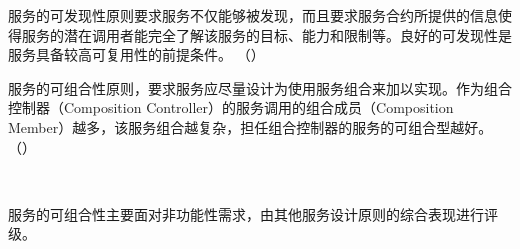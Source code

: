 \begin{problem}
	服务的可发现性原则要求服务不仅能够被发现，而且要求服务合约所提供的信息使得服务的潜在调用者能完全了解该服务的目标、能力和限制等。良好的可发现性是服务具备较高可复用性的前提条件。
	\hfill （）
\end{problem}


\begin{problem}
	服务的可组合性原则，要求服务应尽量设计为使用服务组合来加以实现。作为组合控制器（Composition Controller）的服务调用的组合成员（Composition Member）越多，该服务组合越复杂，担任组合控制器的服务的可组合型越好。
	\hfill （）
\end{problem}
\\ \begin{solution}
	服务的可组合性主要面对非功能性需求，由其他服务设计原则的综合表现进行评级。
\end{solution}


